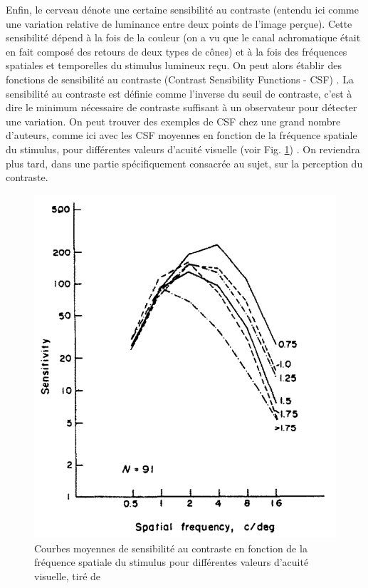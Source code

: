 	\par Enfin, le cerveau dénote une certaine sensibilité au contraste (entendu ici comme une variation relative de luminance entre deux points de l'image perçue). Cette sensibilité dépend à la fois de la couleur (on a vu que le canal achromatique était en fait composé des retours de deux types de cônes) et à la fois des fréquences spatiales et temporelles du stimulus lumineux reçu. On peut alors établir des fonctions de sensibilité au contraste (Contrast Sensibility Functions - CSF) \citep{driscoll_eyes_1978,bezzubik_modeling_2015}. La sensibilité au contraste est définie comme l'inverse du seuil de contraste, c'est à dire le minimum nécessaire de contraste suffisant à un observateur pour détecter une variation. On peut trouver des exemples de CSF chez une grand nombre d'auteurs, comme ici avec les CSF moyennes en fonction de la fréquence spatiale du stimulus, pour différentes valeurs d'acuité visuelle (voir Fig. \ref{fig:contrast_sensitivity_functions_acuity}) \citep{owsley_contrast_1983}. On reviendra plus tard, dans une partie spécifiquement consacrée au sujet, sur la perception du contraste.
	
	\begin{figure}
		\centering
		\includegraphics[scale=.45]{Figures/ContrastSensitivityFunctionAcuity}
		\caption{Courbes moyennes de sensibilité au contraste en fonction de la fréquence spatiale du stimulus pour différentes valeurs d'acuité visuelle, tiré de \citep{owsley_contrast_1983}}
		\label{fig:contrast_sensitivity_functions_acuity}
	\end{figure}
	
